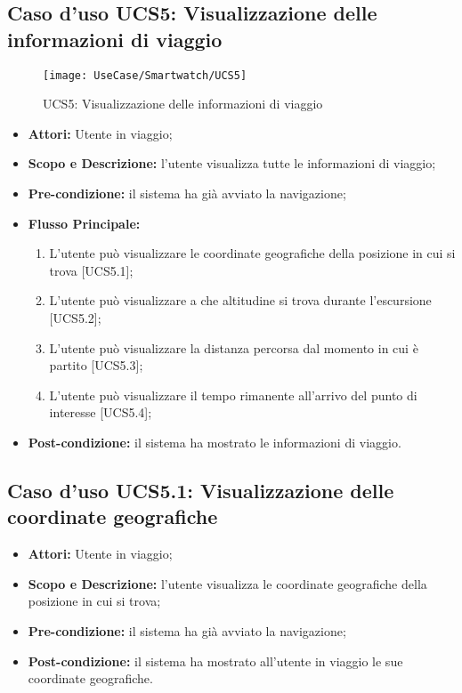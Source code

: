 \subsection{Caso d'uso UCS5: Visualizzazione delle informazioni di viaggio}
\begin{figure}[H]
\centering
\texttt{[image: UseCase/Smartwatch/UCS5]}
\caption{UCS5: Visualizzazione delle informazioni di viaggio}
\end{figure}
\begin{itemize}
\item \textbf{Attori:} Utente in viaggio;
\item \textbf{Scopo e Descrizione:} l'utente visualizza tutte le informazioni di viaggio;
\item \textbf{Pre-condizione:} il sistema ha già avviato la navigazione;
\item \textbf{Flusso Principale:} 
\begin{enumerate}
\item L'utente può visualizzare le coordinate geografiche della posizione in cui si trova [UCS5.1];
\item L'utente può visualizzare a che altitudine si trova durante l'escursione [UCS5.2];
\item L'utente può visualizzare la distanza percorsa dal momento in cui è partito [UCS5.3];
\item L'utente può visualizzare il tempo rimanente all'arrivo del punto di interesse [UCS5.4];
\end{enumerate}
\item \textbf{Post-condizione:} il sistema ha mostrato le informazioni di viaggio.
\end{itemize}

\subsection{Caso d'uso UCS5.1: Visualizzazione delle coordinate geografiche}
\begin{itemize}
\item \textbf{Attori:} Utente in viaggio;
\item \textbf{Scopo e Descrizione:} l'utente visualizza le coordinate geografiche della posizione in cui si trova;
\item \textbf{Pre-condizione:} il sistema ha già avviato la navigazione;
\item \textbf{Post-condizione:} il sistema ha mostrato all'utente in viaggio le sue coordinate geografiche.
\end{itemize}

